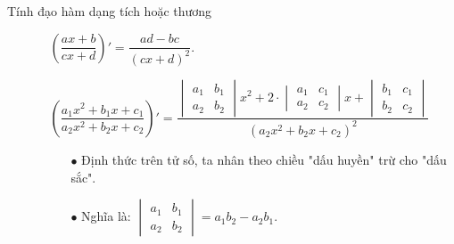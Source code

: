 \begin{dang}{Tính đạo hàm dạng tích hoặc thương}
	\begin{itemize}
		\item [\iconCH]   
		\item [\iconCH] 
		\begin{boxdl}
			\begin{itemize}
				\item [\ding{172}]  $\left(\dfrac{ax+ b}{cx + d}\right)' = \dfrac{ad - bc}{\left(cx + d\right)^2}$.
				\item [\ding{173}]  $\left(\dfrac{a_1 x^2 + b_1 x + c_1}{a_2 x^2 + b_2 x + c_2}\right)' = \dfrac{\begin{vmatrix}
						a_1&b_1\\
						a_2&b_2
					\end{vmatrix}x^2 + 2 \cdot \begin{vmatrix}
						a_1&c_1\\
						a_2&c_2
					\end{vmatrix}x + \begin{vmatrix}
						b_1&c_1\\
						b_2&c_2
				\end{vmatrix}}{\left(a_2 x^2 + b_2 x + c_2\right)^2}$
				\begin{itemize}
					\item [$\bullet$] Định thức trên tử số, ta nhân theo chiều "dấu huyền" trừ cho "dấu sắc".
					\item [$\bullet$] Nghĩa là: $\begin{vmatrix}
						a_1&b_1\\
						a_2&b_2
					\end{vmatrix}=a_1b_2-a_2b_1.$
				\end{itemize}
			\end{itemize}
		\end{boxdl}
	\end{itemize}
\end{dang}


